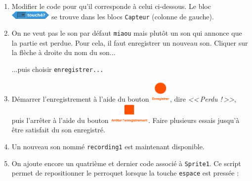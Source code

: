 \vspace{12pt}


\vspace{12pt}





\begin{enumerate}
\item Modifier le code pour qu'il corresponde à celui ci-dessous. Le bloc \includegraphics[width=2cm]{./images/scratch/BlocCapteur} se trouve dans les blocs \texttt{Capteur} (colonne de gauche).
\item On ne veut pas le son par défaut \texttt{miaou} mais plutôt un son qui annonce que la partie est perdue. Pour cela, il faut enregistrer un nouveau son. Cliquer sur la flèche à droite du nom du son...

...puis choisir \texttt{enregistrer...}

\item Démarrer l'enregistrement à l'aide du bouton \includegraphics[width=1cm]{./images/scratch/boutonEnregistrer.png}, dire \emph{<<\,Perdu !\,>>}, puis l'arrêter à l'aide du bouton \includegraphics[width=2cm]{./images/scratch/boutonArret.png}. Faire plusieurs essais jusqu'à être satisfait du son enregistré.
\item Un nouveau son nommé \texttt{recording1} est maintenant disponible. %
\item On ajoute encore un quatrième et dernier code associé à \texttt{Sprite1}. Ce script permet de repositionner le perroquet lorsque la touche \texttt{espace} est pressée :
\end{enumerate}













